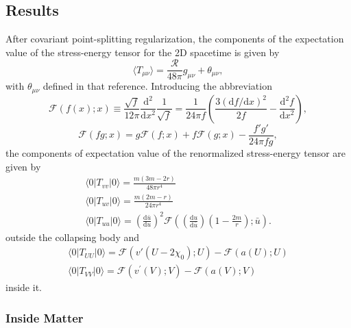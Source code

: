 \documentclass[reprint,amsmath,amssymb,aps,nofootinbib]{revtex4-1}
\newcommand{\ud}{\mathrm{d}}
\begin{document}
\subsection{Results}
After covariant point-splitting regularization, the components of the expectation value of the stress-energy tensor for the 2D spacetime is given by \cite{DFU}
\begin{equation}
 \langle T_{\mu\nu}\rangle=\frac{\mathscr R}{48\pi}g_{\mu\nu}+\theta_{\mu\nu},
 \label{VEV}
\end{equation}
with $\theta_{\mu\nu}$ defined in that reference.
Introducing the abbreviation $$\mathcal F(f(x);x)\equiv\frac{\sqrt{f}}{12\pi}\frac{\ud^2}{\ud x^2}\frac{1}{\sqrt{f}}=\frac{1}{24\pi f}\left(\frac{3(\ud f/\ud x)^2}{2f}-\frac{\ud^2f}{\ud x^2}\right),$$
\[\mathcal F(fg;x)=g\mathcal F(f;x)+f\mathcal F(g;x)-\frac{f'g'}{24\pi fg},\]
the components of expectation value of the renormalized stress-energy tensor are given by \cite{DFU}
\begin{gather}
 \langle0|T_{vv}|0\rangle=\frac{m(3m-2r)}{48\pi r^4}\\
 \langle0|T_{uv}|0\rangle=\frac{m(2m-r)}{24\pi r^4}\\
 \langle0|T_{uu}|0\rangle=\left(\frac{\ud\bar u}{\ud u}\right)^2\mathcal F\left(\left(\frac{\ud u}{\ud \bar u}\right)\left(1-\frac{2m}{r}\right);\bar u\right).
 \label{Text}
\end{gather}
outside the collapsing body and \cite{davies, BirrelDavies}
\begin{gather}
 \langle0|T_{UU}|0\rangle=\mathcal F(v'(U-2\chi_0);U)-\mathcal F(a(U);U)\\
 \langle0|T_{VV}|0\rangle=\mathcal F(v^\prime(V);V)-\mathcal F(a(V);V)
 \label{Tint}
\end{gather}
inside it.

\subsubsection{Inside Matter}
\end{document}
